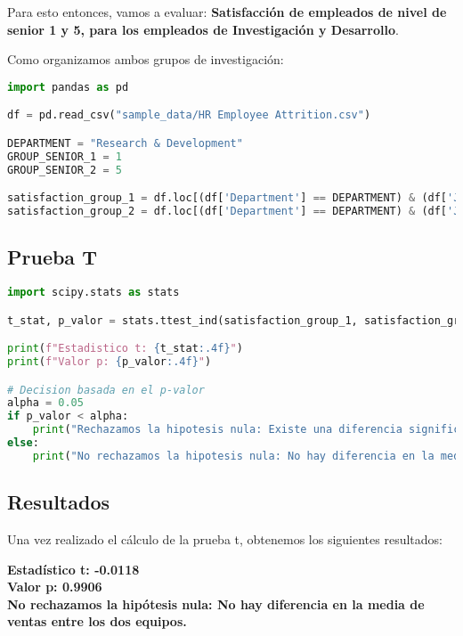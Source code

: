 Para esto entonces, vamos a evaluar: \textbf{Satisfacción de empleados de nivel de senior 1 y 5,
para los empleados de Investigación y Desarrollo}.

Como organizamos ambos grupos de investigación:

\begin{lstlisting}[language=Python]
import pandas as pd

df = pd.read_csv("sample_data/HR Employee Attrition.csv")

DEPARTMENT = "Research & Development"
GROUP_SENIOR_1 = 1
GROUP_SENIOR_2 = 5

satisfaction_group_1 = df.loc[(df['Department'] == DEPARTMENT) & (df['JobLevel'] == GROUP_SENIOR_1), 'JobSatisfaction']
satisfaction_group_2 = df.loc[(df['Department'] == DEPARTMENT) & (df['JobLevel'] == GROUP_SENIOR_2),  'JobSatisfaction']
\end{lstlisting}

\subsection{Prueba T}

\begin{lstlisting}[language=Python]
import scipy.stats as stats

t_stat, p_valor = stats.ttest_ind(satisfaction_group_1, satisfaction_group_2)

print(f"Estadistico t: {t_stat:.4f}")
print(f"Valor p: {p_valor:.4f}")

# Decision basada en el p-valor
alpha = 0.05
if p_valor < alpha:
    print("Rechazamos la hipotesis nula: Existe una diferencia significativa en la media de ventas entre los dos equipos.")
else:
    print("No rechazamos la hipotesis nula: No hay diferencia en la media de ventas entre los dos equipos.")    
\end{lstlisting}


\subsection{Resultados}
Una vez realizado el cálculo de la prueba t, obtenemos los siguientes resultados:

\textbf{Estadístico t: -0.0118}
\\
\textbf{Valor p: 0.9906}
\\
\textbf{No rechazamos la hipótesis nula: No hay diferencia en la media de ventas entre los dos equipos.} \cite{code}